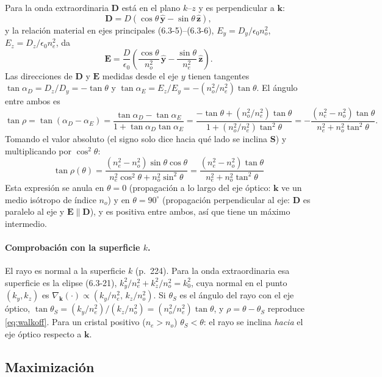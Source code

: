 \documentclass{article}
\newcommand{\yh}{\hat{\mathbf{y}}}
\newcommand{\zh}{\hat{\mathbf{z}}}
\newcommand{\kv}{\mathbf{k}}
\newcommand{\Sv}{\mathbf{S}}
\newcommand{\Ev}{\mathbf{E}}
\newcommand{\Dv}{\mathbf{D}}
\begin{document}
Para la onda extraordinaria $\Dv$ está en el plano
$k$--$z$ y es perpendicular a $\kv$:
\[
\Dv=D\left(\cos\theta\,\yh-\sin\theta\,\zh\right),
\]
y la relación material en ejes principales (6.3-5)--(6.3-6), $E_y=D_y/\epsilon_0n_o^2$,
$E_z=D_z/\epsilon_0n_e^2$, da
\[
\Ev=\frac{D}{\epsilon_0}\left(\frac{\cos\theta}{n_o^2}\,\yh-\frac{\sin\theta}{n_e^2}\,\zh\right).
\]
Las direcciones de $\Dv$ y $\Ev$ medidas desde el eje $y$ tienen tangentes
$\tan\alpha_D=D_z/D_y=-\tan\theta$ y $\tan\alpha_E=E_z/E_y=-(n_o^2/n_e^2)\tan\theta$. El ángulo
entre ambos es
\[
\tan\rho=\tan(\alpha_D-\alpha_E)=\frac{\tan\alpha_D-\tan\alpha_E}{1+\tan\alpha_D\tan\alpha_E}
=\frac{-\tan\theta+(n_o^2/n_e^2)\tan\theta}{1+(n_o^2/n_e^2)\tan^2\theta}
=-\frac{(n_e^2-n_o^2)\tan\theta}{n_e^2+n_o^2\tan^2\theta}.
\]
Tomando el valor absoluto (el signo solo dice hacia qué lado se inclina $\Sv$) y multiplicando por
$\cos^2\theta$:
\begin{equation}
\boxed{\;\tan\rho(\theta)=\frac{(n_e^2-n_o^2)\sin\theta\cos\theta}{n_e^2\cos^2\theta+n_o^2\sin^2\theta}
=\frac{(n_e^2-n_o^2)\tan\theta}{n_e^2+n_o^2\tan^2\theta}\;}
\label{eq:walkoff}
\end{equation}
Esta expresión se anula en $\theta=0$ (propagación a lo largo del eje óptico: $\kv$ ve un medio
isótropo de índice $n_o$) y en $\theta=90^\circ$ (propagación perpendicular al eje: $\Dv$ es
paralelo al eje y $\Ev\parallel\Dv$), y es positiva entre ambos, así que tiene un máximo
intermedio.

\paragraph{Comprobación con la superficie $k$.} El rayo es normal a la superficie $k$ (p.~224).
Para la onda extraordinaria esa superficie es la elipse (6.3-21),
$k_y^2/n_e^2+k_z^2/n_o^2=k_0^2$, cuya normal en el punto $(k_y,k_z)$ es
$\nabla_{\kv}(\cdot)\propto(k_y/n_e^2,\,k_z/n_o^2)$. Si $\theta_S$ es el ángulo del rayo con el eje
óptico, $\tan\theta_S=(k_y/n_e^2)/(k_z/n_o^2)=(n_o^2/n_e^2)\tan\theta$, y
$\rho=\theta-\theta_S$ reproduce \eqref{eq:walkoff}. Para un cristal positivo ($n_e>n_o$)
$\theta_S<\theta$: el rayo se inclina \emph{hacia} el eje óptico respecto a $\kv$.

\subsection*{Maximización}
\end{document}
